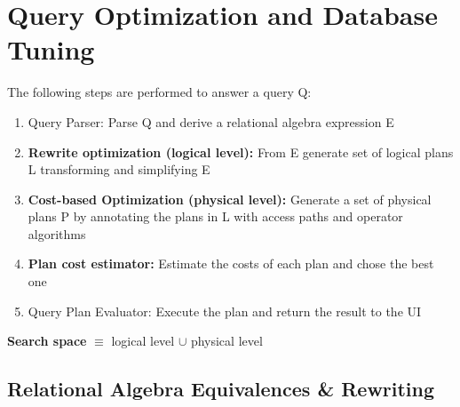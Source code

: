 \chapter{Query Optimization and Database Tuning}

The following steps are performed to answer a query Q:
\begin{enumerate}
    \item Query Parser: Parse Q and derive a relational algebra expression E
    \item \textbf{Rewrite optimization (logical level):} From E generate set of logical plans L transforming and simplifying E
    \item \textbf{Cost-based Optimization (physical level):} Generate a set of physical plans P by annotating the plans in L with access paths and operator algorithms
    \item \textbf{Plan cost estimator:} Estimate the costs of each plan and chose the best one
    \item Query Plan Evaluator: Execute the plan and return the result to the UI
\end{enumerate}
\textbf{Search space} $\equiv$ logical level $\cup$ physical level



\section{Relational Algebra Equivalences \& Rewriting}
